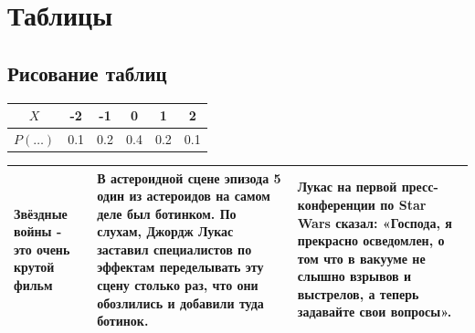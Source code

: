 \documentclass[12pt, a4paper]{article}
\begin{document}
\section{Таблицы}

\subsection{Рисование таблиц}

\begin{tabular}{|c|c|c|c|c|c|}
\hline
$X$ & -2 & -1 & 0 & 1 & 2 \\
\hline
$P(\ldots)$ & 0.1 & 0.2 & 0.4 & 0.2 & 0.1 \\
\hline
\end{tabular}




\vspace{20mm}


\begin{tabularx}{\textwidth}{|X|X|X|}
	\hline
	Звёздные войны - это очень крутой фильм & В астероидной сцене эпизода 5 один из астероидов на самом деле был ботинком. По слухам, Джордж Лукас заставил специалистов по эффектам переделывать эту сцену столько раз, что они обозлились и добавили туда ботинок. & Лукас на первой пресс-конференции по Star Wars сказал: «Господа, я прекрасно осведомлен, о том что в вакууме не слышно взрывов и выстрелов, а теперь задавайте свои вопросы».   \\
	\hline
\end{tabularx}


\vspace{20mm}
\end{document}
